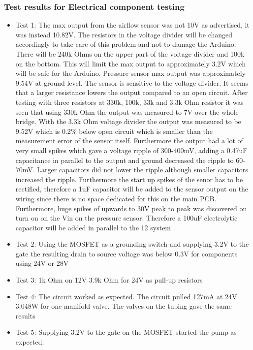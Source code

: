 \subsubsection{Test results for Electrical component testing}
\label{sec:Test-Results-Electrical-Component-Testing}
\begin{itemize}
\item Test 1: The max output from the airflow sensor was not 10V as advertised, it was instead 10.82V.  The resistors in the voltage divider will be changed accordingly to take care of this problem and not to damage the Arduino. There will be 240k Ohms on the upper part of the voltage divider and 100k on the bottom. This will limit the max output to approximately 3.2V which will be safe for the Arduino. Pressure sensor max output was approximately 9.54V at ground level. The sensor is sensitive to the voltage divider. It seems that a larger resistance lowers the output compared to an open circuit. After testing with three resistors at 330k, 100k, 33k and 3.3k Ohm resistor it was seen that using 330k Ohm the output was measured to 7V over the whole bridge. With the 3.3k Ohm voltage divider the output was measured to be 9.52V which is 0.2$\%$ below open circuit which is smaller than the measurement error of the sensor itself. Furthermore the output had a lot of very small spikes which gave a voltage ripple of 300-400mV, adding a 0.47uF capacitance in parallel to the output and ground decreased the ripple to 60-70mV. Larger capacitors did not lower the ripple although smaller capacitors increased the ripple. Furthermore the start up spikes of the senor has to be rectified, therefore a 1uF capacitor will be added to the sensor output on the wiring since there is no space dedicated for this on the main PCB. Furthermore, huge spikes of upwards to 30V peak to peak was discovered on turn on on the Vin on the pressure sensor. Therefore a 100uF electrolytic capacitor will be added in parallel to the 12 system
\item Test 2: Using the MOSFET as a grounding switch and supplying 3.2V to the gate the resulting drain to source voltage was below 0.3V for components using 24V or 28V
\item Test 3: 1k Ohm on 12V  3.9k Ohm for 24V as pull-up resistors
\item Test 4: The circuit worked as expected. The circuit pulled 127mA at 24V 3.048W for one manifold valve. The valves on the tubing gave the same results
\item Test 5: Supplying 3.2V to the gate on the MOSFET started the pump as expected.

\end{itemize}
